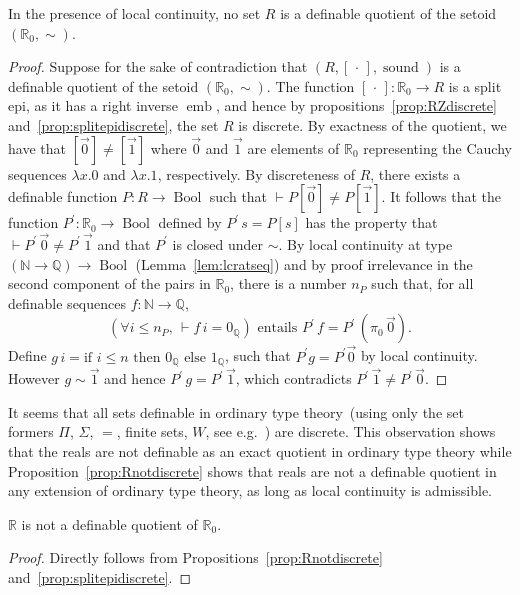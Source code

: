 \documentclass[envcountsame]{llncs}
\newcommand{\N}{\mathbb{N}}
\newcommand{\Q}{\mathbb{Q}}
\newcommand{\R}{\mathbb{R}}
\newcommand{\dotph}{\,\cdot\,} %
\providecommand{\class}[1]{[#1]}
\DeclareMathOperator{\Bool}{Bool}
\DeclareMathOperator{\sound}{sound}
\DeclareMathOperator{\emb}{emb}
\begin{document}
\begin{proposition}\label{prop:Rnotdiscrete} In the presence of local continuity, no set $R$ is a definable quotient of the setoid $(\R_0,\sim)$.
\end{proposition}
\begin{proof}
Suppose for the sake of contradiction that $(R,\class\dotph, \sound)$ is a definable quotient of the setoid $(\R_0,\sim)$. The function $\class\dotph\colon \R_0\to R$ is a split epi, as it has a right inverse $\emb$, and hence by propositions~\ref{prop:RZdiscrete} and~\ref{prop:splitepidiscrete}, the set $R$ is discrete. By exactness of the quotient,  we have that $\class{\vec 0} \neq \class{\vec 1}$ where $\vec 0$ and $\vec 1$ are  elements of $\R_0$ representing the Cauchy sequences $\lambda x.0$ and $\lambda x.1$, respectively. By discreteness of $R$, there exists a definable function $P:R\to\Bool$
such that $\vdash P\class{\vec 0}\neq P\class{\vec 1 }$. It follows that the  function $P^\prime:\R_0\to\Bool$ defined by $P^\prime\,s = P\class{s}$ has the property that $\vdash P^\prime\,\vec0\neq P^\prime\,\vec 1$ and that $P^\prime$ is closed under $\sim$. By local continuity at type $(\N\to\Q)\to\Bool$ (Lemma~\ref{lem:lcratseq}) and by proof irrelevance in the second component of the pairs in $\R_0$, there is a number $n_P$  such that, for all definable sequences $f\colon\N\to\Q$,
\[
\left(\forall i\leq n_P,\, \vdash f\,i = 0_\Q\right)\text{ entails } P^\prime \, f = P^\prime\,(\pi_0\,\vec0).
\]
Define $g\,i=\text{if } i\leq n \text{ then } 0_\Q \text{ else } 1_\Q$, such that $P^\prime g =P^\prime \vec 0$ by local continuity. However $g \sim \vec 1$ and hence $P^\prime\,g=P^\prime\,\vec 1$, which contradicts $P^\prime\,\vec 1 \neq P^\prime\,\vec 0$.

\end{proof}

It seems that all sets definable in ordinary type theory~(using only the set formers $\Pi$, $\Sigma$, $=$, finite sets, $W$, see e.g.~\cite{nordstrom1990programming}) are discrete. This observation shows that the reals are not  definable as an exact quotient in ordinary type theory while Proposition~\ref{prop:Rnotdiscrete} shows that reals are not a definable  quotient in any extension of ordinary type theory, as long as local continuity is admissible.



\begin{corollary}
$\R$ is not a definable quotient of $\R_0$.
\end{corollary}
\begin{proof}
Directly follows from Propositions~\ref{prop:Rnotdiscrete} and~\ref{prop:splitepidiscrete}.
\end{proof}
\end{document}
